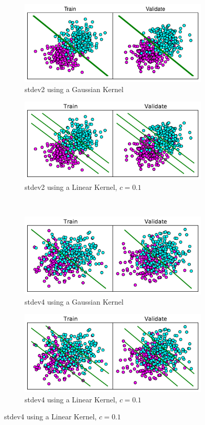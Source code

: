 \documentclass[10pt]{article}
\begin{document}
\begin{figure}[!ht]
\centering
\begin{subfigure}[b]{0.46\textwidth}
	\centering
	\includegraphics[width=.8\textwidth]{1-3-stdev2-0_01-0_1.pdf}
	\caption{stdev2 using a Gaussian Kernel}
	\label{fig:1-3-1}
\end{subfigure}
\begin{subfigure}[b]{0.46\textwidth}
	\centering
	\includegraphics[width=.8\textwidth]{1-3-stdev2-0_01-linear.pdf}
	\caption{stdev2 using a Linear Kernel, $c = 0.1$}
	\label{fig:1-3-2}
\end{subfigure}
\\
\begin{subfigure}[b]{0.46\textwidth}
	\centering
	\includegraphics[width=.8\textwidth]{1-3-stdev4-0_1-0_25-gaussian.pdf}
	\caption{stdev4 using a Gaussian Kernel}
	\label{fig:1-3-3}
\end{subfigure}
\begin{subfigure}[b]{0.46\textwidth}
	\centering
	\includegraphics[width=.8\textwidth]{1-3-stdev4-0_01-linear.pdf}
	\caption{stdev4 using a Linear Kernel, $c = 0.1$}
	\label{fig:1-3-4}
\end{subfigure}
\end{figure}
\end{document}
